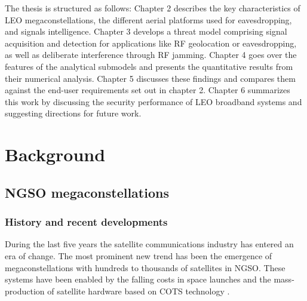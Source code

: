 \documentclass[english, 12pt, a4paper, elec, utf8, a-1b, online]{aaltothesis}
\begin{document}
The thesis is structured as follows:
Chapter 2 describes the key characteristics of LEO megaconstellations, the different aerial platforms used for eavesdropping, and signals intelligence.
Chapter 3 develops a threat model comprising signal acquisition and detection for applications like RF geolocation or eavesdropping, as well as deliberate interference through RF jamming.
Chapter 4 goes over the features of the analytical submodels and presents the quantitative results from their numerical analysis.
Chapter 5 discusses these findings and compares them against the end-user requirements set out in chapter 2.
Chapter 6 summarizes this work by discussing the security performance of LEO broadband systems and suggesting directions for future work.

\clearpage

\section{Background}

\subsection{NGSO megaconstellations}
\subsubsection{History and recent developments}
During the last five years the satellite communications industry has entered an era of change.
The most prominent new trend has been the emergence of megaconstellations with hundreds to thousands of satellites in NGSO.
These systems have been enabled by the falling costs in space launches and the mass-production of satellite hardware based on COTS technology \cite{portillo2019technical,euspa-secure-satcom-2023,euroconsult-ngso-tracker-2023-q3}.
\end{document}
